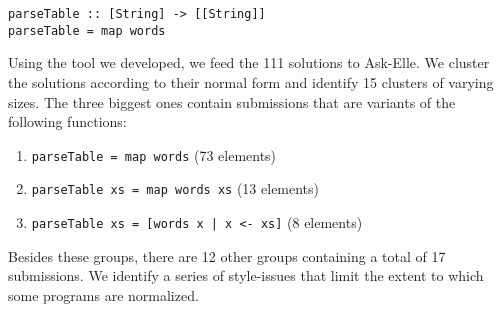 \begin{verbatim}
parseTable :: [String] -> [[String]]
parseTable = map words
\end{verbatim}

Using the tool we developed, we feed the 111 solutions to Ask-Elle. We cluster the solutions according to their normal form and identify 15 clusters of varying sizes. The three biggest ones contain submissions that are variants of the following functions:

\begin{enumerate}
\item \texttt{parseTable = map words} (73 elements)
\item \texttt{parseTable xs = map words xs} (13 elements)
\item \texttt{parseTable xs = [words x | x <- xs]} (8 elements)
\end{enumerate}

Besides these groups, there are 12 other groups containing a total of 17 submissions. We identify a series of style-issues that limit the extent to which some programs are normalized.




